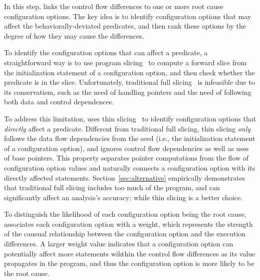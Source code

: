 


In this step, \ourtool links the control flow differences
to one or more root cause configuration options.
The key idea is to identify configuration options that
may affect the behaviorally-deviated predicates, and then rank
these options by the degree of how they may cause
the differences.


To identify the configuration options that can affect
a predicate, a straightforward way is to use program slicing~\cite{Weiser:1981}
to compute a forward slice from the initialization statement
of a configuration option, and then check whether the predicate is
in the slice. Unfortunately, traditional
full slicing~\cite{Weiser:1981} is infeasible due
to its conservatism, such as the need of handling pointers
and the need of following both data and control dependences.


To address this limitation, \ourtool uses thin slicing~\cite{Sridharan:2007}
to identify configuration options that \textit{directly} affect
a predicate. Different from traditional full slicing,
thin slicing \textit{only} follows the data flow dependencies
from the seed (i.e., the initialization statement of a
configuration option), and ignores control flow dependencies
as well as uses of base pointers. This property separates
pointer computations from the flow of configuration option
values and naturally connects a configuration option with its
directly affected statements. Section~\ref{sec:alternative}
empirically demonstrates that traditional full slicing includes
too much of the program, and can significantly affect an analysis's
accuracy; while thin slicing is a better
choice.


To distinguish the likelihood of each configuration
option being the root cause, \ourtool associates each
configuration option with a weight, which represents the strength of
the causual relationship between the configuration option
and the execution differences.
A larger weight value indicates that a configuration option
can potentially affect more statements wihthin the control
flow differences as its value propagates in the program, and thus
the configuration option is more likely
to be the root cause.

